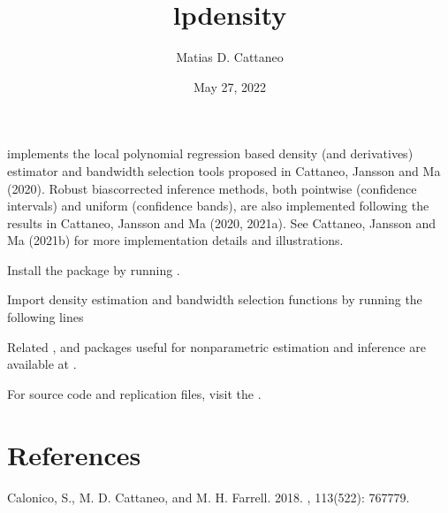 \documentclass[letterpaper,10pt,english]{sphinxmanual}
\title{lpdensity}
\date{May 27, 2022}
\author{Matias D. Cattaneo}
\begin{document}
\pagestyle{empty}
\sphinxmaketitle
\pagestyle{plain}
\sphinxtableofcontents
\pagestyle{normal}
\label{\detokenize{index::doc}}


\sphinxAtStartPar
{} implements the local polynomial regression based density (and derivatives) estimator and bandwidth selection tools proposed in Cattaneo, Jansson and Ma (2020).  Robust bias\sphinxhyphen{}corrected inference methods,
both pointwise (confidence intervals) and uniform (confidence bands), are also implemented
following the results in Cattaneo, Jansson and Ma (2020, 2021a).
See Cattaneo, Jansson and Ma (2021b) for more implementation details and illustrations.

\sphinxAtStartPar
Install the  package by running
.

\sphinxAtStartPar
Import density estimation and bandwidth selection functions by running the following lines

\begin{sphinxVerbatim}[commandchars=\\\{\}]
   
\end{sphinxVerbatim}

\begin{sphinxVerbatim}[commandchars=\\\{\}]
   
\end{sphinxVerbatim}

\sphinxAtStartPar
Related ,  and  packages useful for nonparametric estimation and inference are
available at .

\sphinxAtStartPar
For source code and replication files, visit the .


\chapter{References}
\label{\detokenize{index:references}}
\sphinxAtStartPar
Calonico, S., M. D. Cattaneo, and M. H. Farrell. 2018.
, 113(522): 767\sphinxhyphen{}779.
\end{document}
